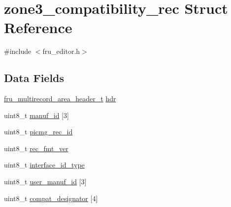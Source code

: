 \hypertarget{structzone3__compatibility__rec}{\section{zone3\-\_\-compatibility\-\_\-rec Struct Reference}
\label{structzone3__compatibility__rec}
}


{\ttfamily \#include $<$fru\-\_\-editor.\-h$>$}

\subsection*{Data Fields}
\begin{DoxyCompactItemize}
\item 
\hyperlink{fru__editor_8h_ad6ac8d0278f7506c13b930cb39a818b3}{fru\-\_\-multirecord\-\_\-area\-\_\-header\-\_\-t} \hyperlink{structzone3__compatibility__rec_aaeee1ffb2bf0753fd609ba04df73e5bb}{hdr}
\item 
uint8\-\_\-t \hyperlink{structzone3__compatibility__rec_a640daa7dbb7c07b257fd79dec05691a8}{manuf\-\_\-id} \mbox{[}3\mbox{]}
\item 
uint8\-\_\-t \hyperlink{structzone3__compatibility__rec_a507f100167e2a5ad0d33537adbdaee58}{picmg\-\_\-rec\-\_\-id}
\item 
uint8\-\_\-t \hyperlink{structzone3__compatibility__rec_a693f5e02220a509d5d42e757503e16c2}{rec\-\_\-fmt\-\_\-ver}
\item 
uint8\-\_\-t \hyperlink{structzone3__compatibility__rec_aa44f2a618536e675647b9c79efaa306f}{interface\-\_\-id\-\_\-type}
\item 
uint8\-\_\-t \hyperlink{structzone3__compatibility__rec_ac98e85b56d97ff872f52f8c9c37f60e2}{user\-\_\-manuf\-\_\-id} \mbox{[}3\mbox{]}
\item 
uint8\-\_\-t \hyperlink{structzone3__compatibility__rec_a03480dbdcacb2554fcb1ac9a50fbbf0a}{compat\-\_\-designator} \mbox{[}4\mbox{]}
\end{DoxyCompactItemize}


